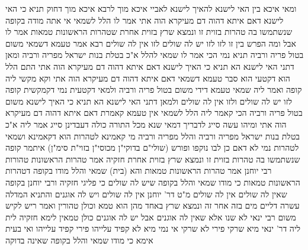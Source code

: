 \documentclass[12pt, openany]{book}
\begin{document}
{ומאי איכא בין האי לישנא להאיך לישנא לאביי איכא מוך
לרבא איכא מוך דחוק 
תניא כי האי לישנא דאם איתא דהוה דם מעיקרא הוה אתי אמר לו הלל לשמאי אי אתה מודה בקופה שנשתמשו בה טהרות בזוית זו ונמצא שרץ בזוית אחרת שטהרות הראשונות טמאות אמר לו אבל 
ומה הפרש בין זו לזו לזו יש לה שולים לזו אין לה שולים 
רבא אמר טעמא דשמאי משום בטול פריה ורביה תניא נמי הכי אמר לו שמאי להלל א"כ בטלת בנות ישראל מפריה ורביה 
ומאן דתני האי לישנא הא תניא כי האיך לישנא דאם איתא דהוה דם מעיקרא הוה אתי התם הלל הוא דקטעי הוא סבר טעמא דשמאי דאם איתא דהוה דם מעיקרא הוה אתי וקא מקשי ליה קופה 
ואמר ליה שמאי טעמא דידי משום בטול פריה ורביה ולמאי דקטעית נמי דקמקשית קופה לזו יש לה שולים ולזו אין לה שולים 
ולמאן דתני האי לישנא הא תניא כי האיך לישנא משום בטול פריה ורביה 
הכי קאמר ליה הלל לשמאי אין טעמא קאמרת דאם איתא דהוה דם מעיקרא הוה אתי ומיהו עשה סייג לדבריך דמאי שנא מכל התורה כולה דעבדינן סייג 
אמר ליה א"כ בטלת בנות ישראל מפריה ורביה והלל מפריה ורביה מי קאמינא לטהרות הוא דקאמינא 
ושמאי לטהרות נמי לא דאם כן לבו נוקפו ופורש 
(שולי"ם בדוקי"ן מכוסי"ן בזוי"ת סימ"ן) איתמר קופה שנשתמשו בה טהרות בזוית זו ונמצא שרץ בזוית אחרת חזקיה אמר טהרות הראשונות טהורות רבי יוחנן אמר טהרות הראשונות טמאות והא (בית) שמאי והלל מודו בקופה דטהרות הראשונות טמאות 
כי מודו שמאי והלל בקופה שיש לה שולים כי פליגי חזקיה ורבי יוחנן בקופה שאין לה שולים 
אין לה שולים מ"ט דר' יוחנן אין לה שולים ויש לה אוגנים 
והתניא המדלה עשרה דליים מים בזה אחר זה ונמצא שרץ באחד מהן הוא טמא וכולן טהורין ואמר ריש לקיש משום רבי ינאי לא שנו אלא שאין לה אוגנים אבל יש לה אוגנים כולן טמאין 
לימא חזקיה לית ליה דר' ינאי מיא שרקי פירי לא שרקי 
אי נמי מיא לא קפיד עלייהו פירי קפיד עלייהו 
ואי בעית אימא כי מודו שמאי והלל בקופה שאינה בדוקה}
\end{document}
